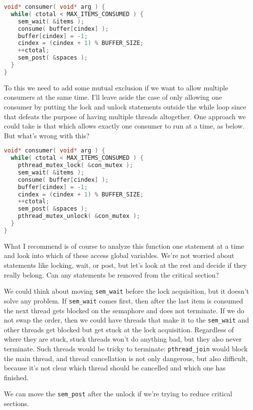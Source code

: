 \begin{lstlisting}[language=C]
void* consumer( void* arg ) { 
  while( ctotal < MAX_ITEMS_CONSUMED ) {
    sem_wait( &items );
    consume( buffer[cindex] );
    buffer[cindex] = -1;
    cindex = (cindex + 1) % BUFFER_SIZE;
    ++ctotal;
    sem_post( &spaces );
  }
}
\end{lstlisting}

To this we need to add some mutual exclusion if we want to allow multiple consumers at the same time. I'll leave aside the case of only allowing one consumer by putting the lock and unlock statements outside the while loop since that defeats the purpose of having multiple threads altogether. One approach we could take is that which allows exactly one consumer to run at a time, as below. But what's wrong with this?

\begin{lstlisting}[language=C]
void* consumer( void* arg ) { 
  while( ctotal < MAX_ITEMS_CONSUMED ) {
    pthread_mutex_lock( &con_mutex );
    sem_wait( &items );
    consume( buffer[cindex] );
    buffer[cindex] = -1;
    cindex = (cindex + 1) % BUFFER_SIZE;
    ++ctotal;
    sem_post( &spaces );
    pthread_mutex_unlock( &con_mutex );
  }
}
\end{lstlisting}

What I recommend is of course to analyze this function one statement at a time and look into which of these access global variables. We're not worried about statements like locking, wait, or post, but let's look at the rest and decide if they really belong. Can any statements be removed from the critical section?

We could think about moving {\tt sem\_wait} before the lock acquisition, but it doesn't solve any problem. If {\tt sem\_wait} comes first, then after the last item is consumed the next thread gets blocked on the semaphore and does not terminate. If we do not swap the order, then we could have threads that make it to the {\tt sem\_wait} and other threads get blocked but get stuck at the lock acquisition. Regardless of where they are stuck, stuck threads won't do anything bad, but they also never terminate. Such threads would be tricky to terminate: {\tt pthread\_join} would block the main thread, and thread cancellation is not only dangerous, but also difficult, because it's not clear which thread should be cancelled and which one has finished.

We can move the {\tt sem\_post} after the unlock if we're trying to reduce critical sections.

